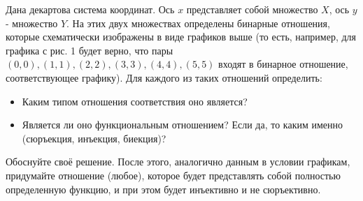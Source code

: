 \documentclass[10pt]{exam}
\begin{document}
\begin{questions}
\question
Дана декартова система координат. Ось $x$ представляет собой множество $X$, ось $y$ - множество $Y$. На этих двух множествах определены бинарные отношения, которые схематически изображены в виде графиков выше (то есть, например, для графика с рис. 1 будет верно, что пары $(0, 0), (1, 1), (2, 2), (3, 3), (4, 4), (5, 5)$ входят в бинарное отношение, соответствующее графику). Для каждого из таких отношений определить:
\begin{itemize}
    \item Каким типом отношения соответствия оно является?
    \item Является ли оно функциональным отношением? Если да, то каким именно (сюръекция, инъекция, биекция)?
\end{itemize}
Обоснуйте своё решение. После этого, аналогично данным в условии графикам, придумайте отношение (любое), которое будет представлять собой полностью определенную функцию, и при этом будет инъективно и не сюръективно.
\\
\begin{figure}[h]


\end{figure}
\end{questions}
\end{document}

